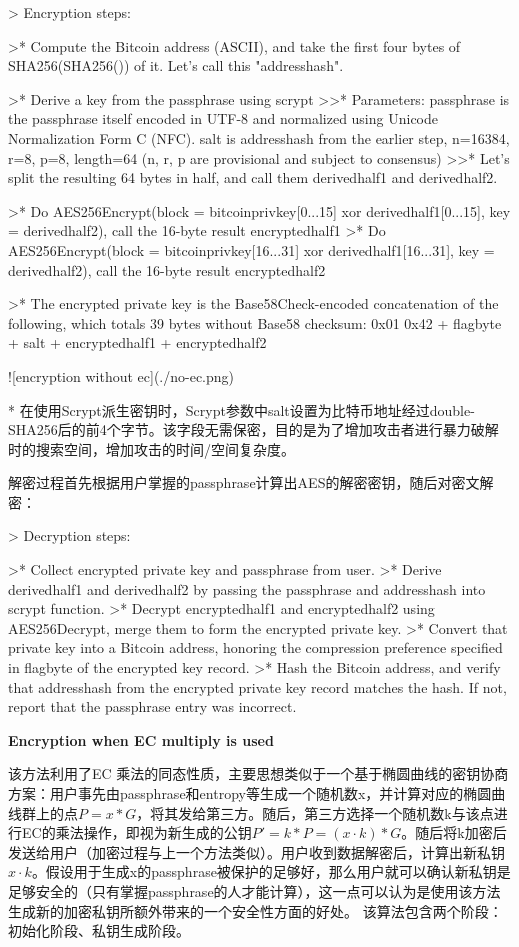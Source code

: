 \documentclass{article}
\begin{document}
> Encryption steps:

>* Compute the Bitcoin address (ASCII), and take the first four bytes of SHA256(SHA256()) of it. Let's call this "addresshash".

>* Derive a key from the passphrase using scrypt  
>>* Parameters: passphrase is the passphrase itself encoded in UTF-8 and normalized using Unicode Normalization Form C (NFC). salt is addresshash from the earlier step, n=16384, r=8, p=8, length=64 (n, r, p are provisional and subject to consensus)  
>>* Let's split the resulting 64 bytes in half, and call them derivedhalf1 and derivedhalf2.  

>* Do AES256Encrypt(block = bitcoinprivkey[0...15] xor derivedhalf1[0...15], key = derivedhalf2), call the 16-byte result encryptedhalf1  
>* Do AES256Encrypt(block = bitcoinprivkey[16...31] xor derivedhalf1[16...31], key = derivedhalf2), call the 16-byte result encryptedhalf2  

>* The encrypted private key is the Base58Check-encoded concatenation of the following, which totals 39 bytes without Base58 checksum:
0x01 0x42 + flagbyte + salt + encryptedhalf1 + encryptedhalf2

![encryption without ec](./no-ec.png)

* 在使用Scrypt派生密钥时，Scrypt参数中salt设置为比特币地址经过double-SHA256后的前4个字节。该字段无需保密，目的是为了增加攻击者进行暴力破解时的搜索空间，增加攻击的时间/空间复杂度。




 解密过程首先根据用户掌握的passphrase计算出AES的解密密钥，随后对密文解密：

> Decryption steps:

>* Collect encrypted private key and passphrase from user.  
>* Derive derivedhalf1 and derivedhalf2 by passing the passphrase and addresshash into scrypt function.  
>* Decrypt encryptedhalf1 and encryptedhalf2 using AES256Decrypt, merge them to form the encrypted private key.  
>* Convert that private key into a Bitcoin address, honoring the compression preference specified in flagbyte of the encrypted key record.  
>* Hash the Bitcoin address, and verify that addresshash from the encrypted private key record matches the hash. If not, report that the passphrase entry was incorrect.  

\textbf{  Encryption when EC multiply is used}

该方法利用了EC 乘法的同态性质，主要思想类似于一个基于椭圆曲线的密钥协商方案：用户事先由passphrase和entropy等生成一个随机数x，并计算对应的椭圆曲线群上的点$P=x*G$，将其发给第三方。随后，第三方选择一个随机数k与该点进行EC的乘法操作，即视为新生成的公钥$P'=k*P=(x \cdot k)*G$。随后将k加密后发送给用户（加密过程与上一个方法类似）。用户收到数据解密后，计算出新私钥$x\cdot k$。假设用于生成x的passphrase被保护的足够好，那么用户就可以确认新私钥是足够安全的（只有掌握passphrase的人才能计算），这一点可以认为是使用该方法生成新的加密私钥所额外带来的一个安全性方面的好处。
该算法包含两个阶段：初始化阶段、私钥生成阶段。
\end{document}
